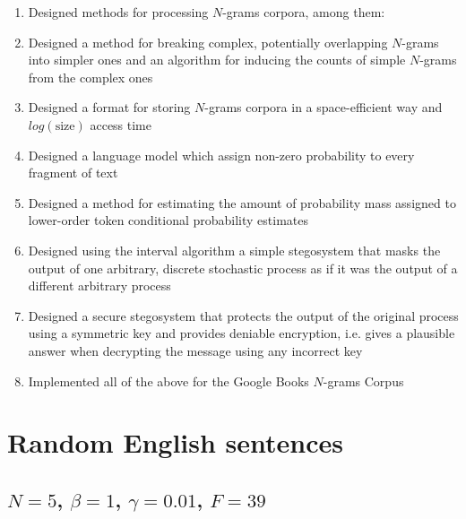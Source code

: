 \documentclass[draft]{IIBproject}
\makeatletter
\DeclareRobustCommand*{\ie}{i.e.\@\xspace}
\makeatother
\begin{document}
\begin{enumerate}
	\item Designed methods for processing $N$-grams corpora, among them:
	\item Designed a method for breaking complex, potentially overlapping $N$-grams into simpler ones and an algorithm for inducing the counts of simple $N$-grams from the complex ones
	\item Designed a format for storing $N$-grams corpora in a space-efficient way and $log(\text{size})$ access time
	\item Designed a language model which assign non-zero probability to every fragment of text
	\item Designed a method for estimating the amount of probability mass assigned to lower-order token conditional probability estimates
	\item Designed using the interval algorithm a simple stegosystem that masks the output of one arbitrary, discrete stochastic process as if it was the output of a different arbitrary process
	\item Designed a secure stegosystem that protects the output of the original process using a symmetric key and provides deniable encryption, \ie gives a plausible answer when decrypting the message using any incorrect key
	\item Implemented all of the above for the Google Books $N$-grams Corpus
\end{enumerate}

\cleardoublepage
\footnotesize



\cleardoublepage
\appendix
\section{Random English sentences}
\label{sec:random_english_sentences}

%
\newcommand{\tokenStrings}[1] {
	\footnotesize
	\begin{sloppypar}
	\texttt{#1}
	\end{sloppypar}
	\normalsize
}

\subsection{$N = 5$, $\beta = 1$, $\gamma = 0.01$, $F = 39$}
\end{document}
